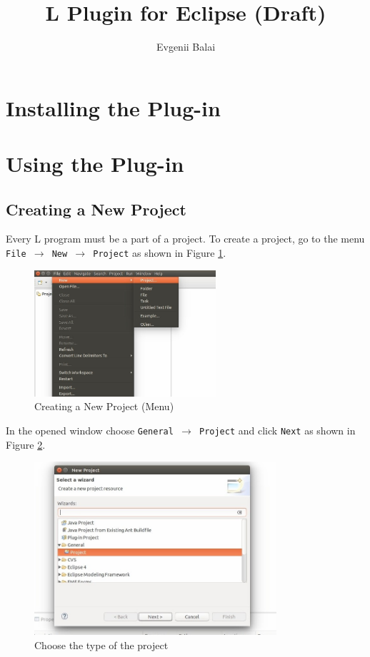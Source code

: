\documentclass[a4paper,10pt]{article}
\title{L Plugin for Eclipse (Draft)}
\author{Evgenii Balai}
\def\st{\noindent}
\begin{document}
\maketitle
\st
\setcounter{tocdepth}{2}
\tableofcontents

\section{Installing the Plug-in}

\section{Using the Plug-in}
 
\subsection{Creating a New Project}
Every L program must be a part of a project. To create a project, go to the menu \texttt{File $\to$  New $\to$ Project} as shown in Figure \ref{fig1}.


\begin{figure}[H]
\centering
\includegraphics[width=0.6\textwidth]{1}
\caption{Creating a New Project (Menu)}\label{fig1}
\end{figure}
\noindent
In the opened window choose \texttt{General $\to$ Project} and click  \texttt{Next} as shown in Figure \ref{fig2}.
\begin{figure}[H]
\centering
\includegraphics[width=0.8\textwidth]{2}
\caption{Choose the type of the project}\label{fig2}
\end{figure}
\end{document}
